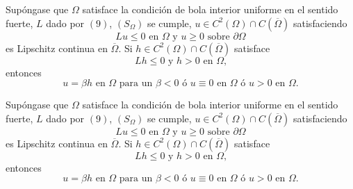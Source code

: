 



\begin{theorem}
Sup\'{o}ngase que $\Omega$ satisface la condici\'{o}n de bola interior
uniforme en el sentido fuerte, $L$ dado por $\left(  9\right)  $, $\left(
S_{\Omega}\right)  $ se cumple, $u\in C^{2}\left(  \Omega\right)  \cap
C\left(  \overline{\Omega}\right)  $ satisfaciendo
\[
Lu\leq0\text{ \ en }\Omega\text{ \ y }u\geq0\text{ \ sobre }\partial\Omega
\]
es Lipschitz continua en $\overline{\Omega}$. Si $h\in C^{2}\left(
\Omega\right)  \cap C\left(  \overline{\Omega}\right)  $ satisface
\[
Lh\leq0\text{ \ y \ }h>0\text{ en }\Omega\text{,}%
\]
entonces
\[
u=\beta h\text{ \ en }\Omega\text{ para un }\beta<0\text{ \ \'{o} \ }%
u\equiv0\text{ \ en }\Omega\text{ \ \'{o} }u>0\text{ \ en }\Omega\text{.}%
\]

\end{theorem}







\begin{theorem}
Sup\'{o}ngase que $\Omega$ satisface la condici\'{o}n de bola interior
uniforme en el sentido fuerte, $L$ dado por $\left(  9\right)  $, $\left(
S_{\Omega}\right)  $ se cumple, $u\in C^{2}\left(  \Omega\right)  \cap
C\left(  \overline{\Omega}\right)  $ satisfaciendo
\[
Lu\leq0\text{ \ en }\Omega\text{ \ y }u\geq0\text{ \ sobre }\partial\Omega
\]
es Lipschitz continua en $\overline{\Omega}$. Si $h\in C^{2}\left(
\Omega\right)  \cap C\left(  \overline{\Omega}\right)  $ satisface
\[
Lh\leq0\text{ \ y \ }h>0\text{ en }\Omega\text{,}%
\]
entonces
\[
u=\beta h\text{ \ en }\Omega\text{ para un }\beta<0\text{ \ \'{o} \ }%
u\equiv0\text{ \ en }\Omega\text{ \ \'{o} }u>0\text{ \ en }\Omega\text{.}%
\]

\end{theorem}


